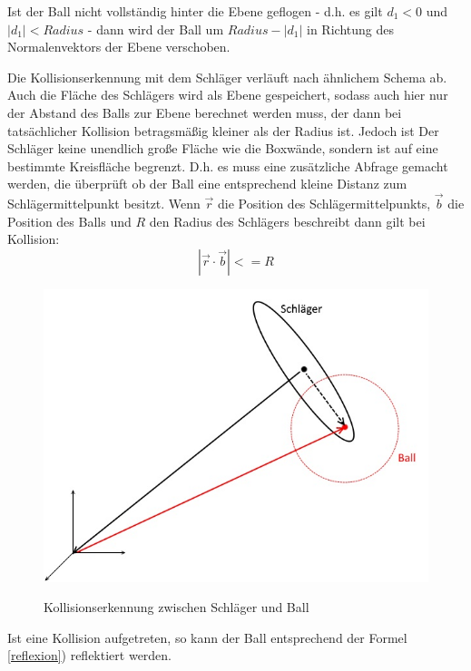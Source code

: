 Ist der Ball nicht vollständig hinter die Ebene geflogen - d.h. es gilt $d_1<0$ und $|d_1|<Radius $ - dann wird der Ball um $Radius - |d_1|$ in Richtung des Normalenvektors der Ebene verschoben.

Die Kollisionserkennung mit dem Schläger verläuft nach ähnlichem Schema ab. Auch die Fläche des Schlägers wird als Ebene gespeichert, sodass auch hier nur der Abstand des Balls zur Ebene berechnet werden muss, der dann bei tatsächlicher Kollision betragsmäßig kleiner als der Radius ist. Jedoch ist Der Schläger keine unendlich große Fläche wie die  Boxwände, sondern ist auf eine bestimmte Kreisfläche begrenzt. D.h. es muss eine zusätzliche Abfrage gemacht werden, die überprüft ob der Ball eine entsprechend kleine Distanz zum Schlägermittelpunkt besitzt.
Wenn $\vec{r}$ die Position des Schlägermittelpunkts, $\vec{b}$ die Position des Balls und $R$ den Radius des Schlägers beschreibt dann gilt bei Kollision:
\begin{equation}
	|\vec{r}\cdot\vec{b}| <= R
\end{equation}

\begin{figure}[h]
   \begin{center}
    \includegraphics[scale=0.4]{bilder/collisionRacket}\label{fig_colRacket}
   \end{center} 
    \caption{Kollisionserkennung zwischen Schläger und Ball}
        \label{fig_colRacket2}
\end{figure} 

Ist eine Kollision aufgetreten, so kann der Ball entsprechend der Formel \ref{reflexion}) reflektiert werden.

